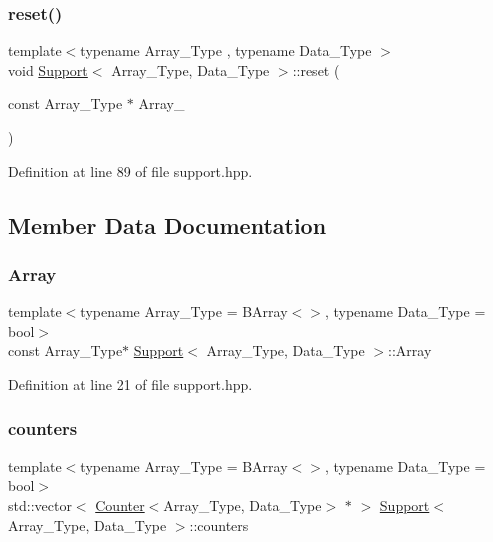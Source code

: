 \subsubsection{\texorpdfstring{reset()}{reset()}\hspace{0.1cm}{\footnotesize\ttfamily [2/2]}}
{\footnotesize\ttfamily template$<$typename Array\+\_\+\+Type , typename Data\+\_\+\+Type $>$ \\
void \hyperlink{class_support}{Support}$<$ Array\+\_\+\+Type, Data\+\_\+\+Type $>$\+::reset (\begin{DoxyParamCaption}\item[{const Array\+\_\+\+Type $\ast$}]{Array\+\_\+ }\end{DoxyParamCaption})\hspace{0.3cm}{\ttfamily [inline]}}



Definition at line 89 of file support.\+hpp.



\subsection{Member Data Documentation}
\mbox{\label{class_support_a73f1375ad76be291f9f3768e9d6f912c}} 
\subsubsection{\texorpdfstring{Array}{Array}}
{\footnotesize\ttfamily template$<$typename Array\+\_\+\+Type  = B\+Array$<$$>$, typename Data\+\_\+\+Type  = bool$>$ \\
const Array\+\_\+\+Type$\ast$ \hyperlink{class_support}{Support}$<$ Array\+\_\+\+Type, Data\+\_\+\+Type $>$\+::Array}



Definition at line 21 of file support.\+hpp.

\mbox{\label{class_support_a650201174421779897fbea8fa4dc766e}} 
\subsubsection{\texorpdfstring{counters}{counters}}
{\footnotesize\ttfamily template$<$typename Array\+\_\+\+Type  = B\+Array$<$$>$, typename Data\+\_\+\+Type  = bool$>$ \\
std\+::vector$<$ \hyperlink{class_counter}{Counter}$<$Array\+\_\+\+Type, Data\+\_\+\+Type$>$ $\ast$ $>$ \hyperlink{class_support}{Support}$<$ Array\+\_\+\+Type, Data\+\_\+\+Type $>$\+::counters}




